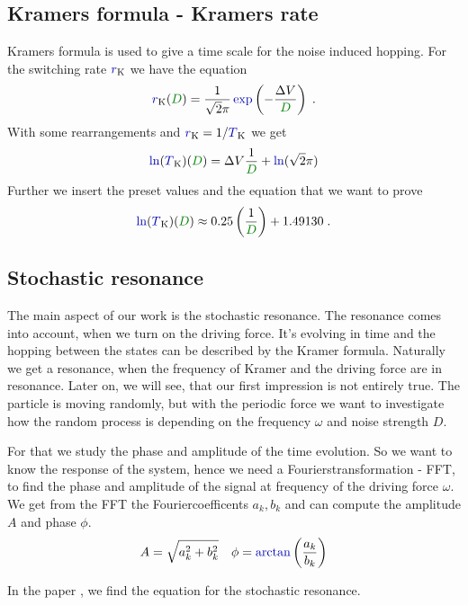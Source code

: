 \documentclass[10pt,fleqn,%
reqno,a4paper]{article}
\makeatletter
\def\mathcolor#1#{\@mathcolor{#1}}
\def\@mathcolor#1#2#3{%
        \protect\leavevmode
        \begingroup\color#1{#2}#3\endgroup
}
\newcommand{\narctan}{\mathcolor{blue!70!black}{\arctan}}
\newcommand{\nexp}{\mathcolor{blue!70!black}{\exp}}
\newcommand{\nr}{\mathcolor{blue!70!black}{r}}
\newcommand{\nT}{\mathcolor{blue!70!black}{T}}
\newcommand{\nln}{\mathcolor{blue!70!black}{\ln}}
\newcommand{\nD}{\mathcolor{green!50!black}{D}}
\makeatother
\begin{document}
\subsection{Kramers formula - Kramers rate} \label{CH:kramers}
Kramers formula is used to give a time scale for the noise induced hopping. For the switching rate $ \nr_{\mathrm{K}} $ we have the equation
\begin{align}
	\nr_{\mathrm{K}}(\nD) = \frac{1}{\sqrt{2}\pi}\nexp\left(- \frac{\Delta V}{\nD} \right)\; . \label{eq:kramer}
\end{align}
With some rearrangements and $ \nr_{{\mathrm{K}}} = 1 / \nT_{{\mathrm{K}}} $ we get
\begin{align}
	\nln (\nT_{\mathrm{K}})(\nD) = \Delta V \frac{1}{\nD} + \nln(\sqrt{2}\pi)
\end{align}
Further we insert the preset values and the equation that we want to prove
\begin{align}
\nln (\nT_{\mathrm{K}})(\nD)\approx 0.25\left( \frac{1}{\nD} \right) + 1.49130 \; . \label{eq:lin-logT_K}
\end{align}

\subsection{Stochastic resonance}
The main aspect of our work is the stochastic resonance. The resonance comes into account, when we turn on the driving force. It's evolving in time and the hopping between the states can be described by the Kramer formula. Naturally we get a resonance, when the frequency of Kramer and the driving force are in resonance. Later on, we will see, that our first impression is not entirely true. 
The particle is moving randomly, but with the periodic force we want to investigate how the random process is depending on the frequency $ \omega $ and noise strength $ D $. 

For that we study the phase and amplitude of the time evolution. So we want to know the response of the system, hence we need a Fourierstransformation - FFT, to find the phase and amplitude of the signal at frequency of the driving force $ \omega $. We get from the FFT the Fouriercoefficents $ a_k, b_k $ and can compute the amplitude $ A $ and phase $ \phi $. 
\begin{align*}
	A = \sqrt{a_k^2+b_k^2} \quad \phi = \narctan\left(\frac{a_k}{b_k}\right)
\end{align*}

In the paper \cite{gammaitoni_stochastic_1998}, we find the equation for the stochastic resonance.
\end{document}
